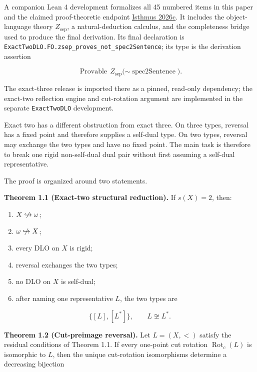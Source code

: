 \documentclass[
  english,
  11pt,
  reqno]{amsart}
\providecommand{\tightlist}{%
  \setlength{\itemsep}{0pt}\setlength{\parskip}{0pt}}
\providecommand{\nhookrightarrow}{\centernot\hookrightarrow}
\begin{document}
A companion Lean 4 development formalizes all 45 numbered items in this
paper and the claimed proof-theoretic endpoint
\hyperref[ref:isthmus2026c]{Isthmus 2026c}. It includes the
object-language theory \(Z_{\mathrm{sep}}\), a natural-deduction
calculus, and the completeness bridge used to produce the final
derivation. Its final declaration is
\texttt{ExactTwoDLO.FO.zsep\_proves\_not\_spec2Sentence}; its type is
the derivation assertion

\[
\operatorname{Provable}\,Z_{\mathrm{sep}}
\bigl(\mathord\sim\operatorname{spec2Sentence}\bigr).
\]

The exact-three release is imported there as a pinned, read-only
dependency; the exact-two reflection engine and cut-rotation argument
are implemented in the separate \texttt{ExactTwoDLO} development.

Exact two has a different obstruction from exact three. On three types,
reversal has a fixed point and therefore supplies a self-dual type. On
two types, reversal may exchange the two types and have no fixed point.
The main task is therefore to break one rigid non-self-dual dual pair
without first assuming a self-dual representative.

The proof is organized around two statements.

\protect{}\label{thm:intro-reduction}

\textbf{Theorem 1.1 (Exact-two structural reduction).} If \(s(X)=2\),
then:

\begin{enumerate}
\tightlist
\item
  \(X\nhookrightarrow\omega\);
\item
  \(\omega\nhookrightarrow X\);
\item
  every DLO on \(X\) is rigid;
\item
  reversal exchanges the two types;
\item
  no DLO on \(X\) is self-dual;
\item
  after naming one representative \(L\), the two types are
\end{enumerate}

\[
   \{[L],[L^*]\},
   \qquad
   L\not\cong L^*.
\]

\protect{}\label{thm:intro-cut-reversal}

\textbf{Theorem 1.2 (Cut-preimage reversal).} Let \(L=(X,<)\) satisfy
the residual conditions of Theorem 1.1. If every one-point cut rotation
\(\operatorname{Rot}_c(L)\) is isomorphic to \(L\), then the unique
cut-rotation isomorphisms determine a decreasing bijection
\end{document}
